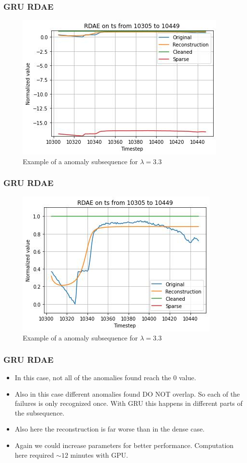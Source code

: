 \documentclass{beamer}
\theoremstyle{plain}
\theoremstyle{definition}
\theoremstyle{remark}
\begin{document}
\begin{frame}
	\frametitle{GRU RDAE}
	\begin{figure}
		\centering
		\includegraphics[width=0.7\linewidth]{Images/GRUlam3.3ts_anomaly10305.jpg}
		\caption[]{Example of a anomaly subsequence for $\lambda=3.3$}
	\end{figure}
\end{frame}

\begin{frame}
	\frametitle{GRU RDAE}
	\begin{figure}
		\centering
		\includegraphics[width=0.7\linewidth]{Images/GRUlam3.3ts_anomalyzoom10305.jpg}
		\caption[]{Example of a anomaly subsequence for $\lambda=3.3$}
	\end{figure}
\end{frame}

\begin{frame}
	\frametitle{GRU RDAE}
	\begin{itemize}
		\item In this case, not all of the anomalies found reach the $0$ value.
		\item Also in this case different anomalies found DO NOT overlap. So each of the failures is only recognized once. With GRU this happens in different parts of the subsequence.
		\item Also here the reconstruction is far worse than in the dense case.
		\item Again we could increase parameters for better performance. Computation here required $\sim 12$ minutes with GPU.
	\end{itemize}
\end{frame}
\end{document}
